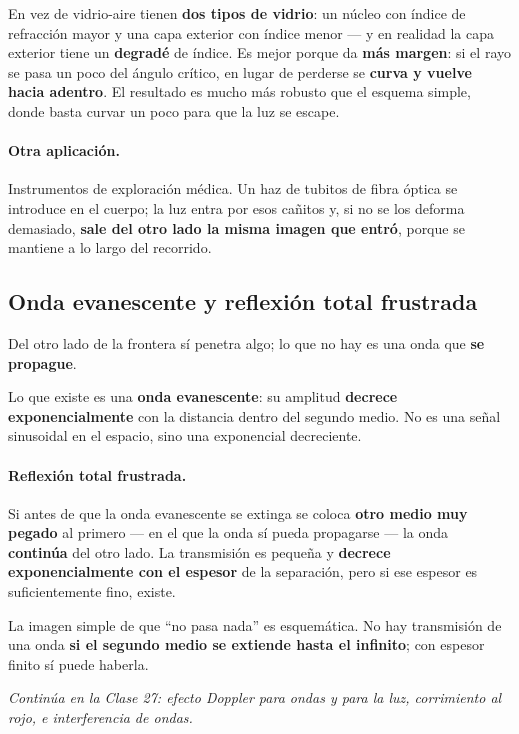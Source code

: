 \documentclass[12pt,a4paper]{article}
\begin{document}
\begin{notebox}
En vez de vidrio-aire tienen \textbf{dos tipos de vidrio}: un núcleo con índice de
refracción mayor y una capa exterior con índice menor --- y en realidad la capa
exterior tiene un \textbf{degradé} de índice. Es mejor porque da \textbf{más
margen}: si el rayo se pasa un poco del ángulo crítico, en lugar de perderse se
\textbf{curva y vuelve hacia adentro}. El resultado es mucho más robusto que el
esquema simple, donde basta curvar un poco para que la luz se escape.
\end{notebox}

\paragraph{Otra aplicación.}
Instrumentos de exploración médica. Un haz de tubitos de fibra óptica se
introduce en el cuerpo; la luz entra por esos cañitos y, si no se los deforma
demasiado, \textbf{sale del otro lado la misma imagen que entró}, porque se
mantiene a lo largo del recorrido.



\subsection{Onda evanescente y reflexión total frustrada}

\begin{warnbox}
Del otro lado de la frontera sí penetra algo; lo que no hay es una onda que
\textbf{se propague}.
\end{warnbox}

Lo que existe es una \textbf{onda evanescente}: su amplitud \textbf{decrece
exponencialmente} con la distancia dentro del segundo medio. No es una señal
sinusoidal en el espacio, sino una exponencial decreciente.

\paragraph{Reflexión total frustrada.}
Si antes de que la onda evanescente se extinga se coloca \textbf{otro medio muy
pegado} al primero --- en el que la onda sí pueda propagarse --- la onda
\textbf{continúa} del otro lado. La transmisión es pequeña y \textbf{decrece
exponencialmente con el espesor} de la separación, pero si ese espesor es
suficientemente fino, existe.

\begin{notebox}[Lectura]
La imagen simple de que \enquote{no pasa nada} es esquemática. No hay transmisión
de una onda \textbf{si el segundo medio se extiende hasta el infinito}; con
espesor finito sí puede haberla.
\end{notebox}

\vspace{1em}
\noindent\emph{Continúa en la Clase 27: efecto Doppler para ondas y para la luz,
corrimiento al rojo, e interferencia de ondas.}
\end{document}
